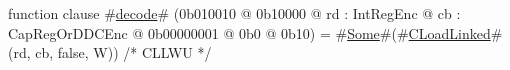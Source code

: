 function clause #\hyperref[zdecode]{decode}# (0b010010 @ 0b10000 @ rd : IntRegEnc @ cb : CapRegOrDDCEnc @ 0b00000001 @ 0b0 @ 0b10) = #\hyperref[zSome]{Some}#(#\hyperref[zCLoadLinked]{CLoadLinked}#(rd, cb, false, W)) /* CLLWU */
